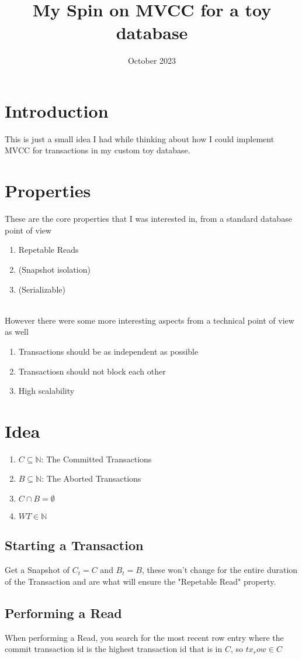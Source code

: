 \documentclass[a4paper, 11pt]{article}
\title{My Spin on MVCC for a toy database}
\date{October 2023}
\begin{document}
\section{Introduction}
This is just a small idea I had while thinking about how I could implement MVCC for transactions in my custom
toy database.

\section{Properties}
These are the core properties that I was interested in, from a standard database point of view
\begin{enumerate}
\item Repetable Reads
\item (Snapshot isolation)
\item (Serializable)
\end{enumerate} \\
However there were some more interesting aspects from a technical point of view as well
\begin{enumerate}
\item Transactions should be as independent as possible
\item Transactiosn should not block each other
\item High scalability
\end{enumerate}

\section{Idea}
\begin{enumerate}
\item $C \subseteq \mathbb{N}$: The Committed Transactions
\item $B \subseteq \mathbb{N}$: The Aborted Transactions
\item $C \cap B = \emptyset$
\item $WT \in \mathbb{N}$
\end{enumerate}

\subsection{Starting a Transaction}
Get a Snapshot of $C_t = C$ and $B_t = B$, these won't change for the entire duration of the Transaction and are what
will ensure the "Repetable Read" property.

\subsection{Performing a Read}
When performing a Read, you search for the most recent row entry where the commit transaction id is the highest transaction id
that is in $C$, so $tx_row \in C$
\end{document}
